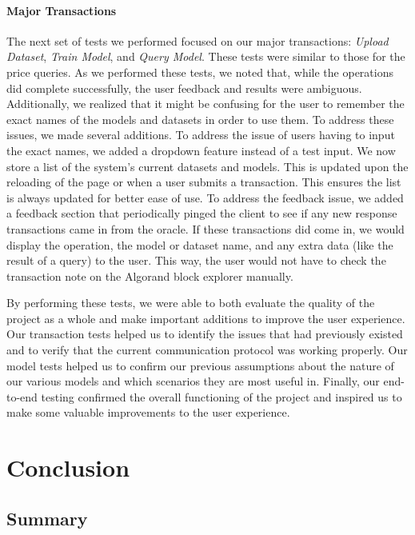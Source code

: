 \documentclass{ledger}
\begin{document}
\paragraph{Major Transactions}
The next set of tests we performed focused on our major transactions: \textit{Upload Dataset}, \textit{Train Model}, and
\textit{Query Model}.  These tests were similar to those for the price queries.  As we performed these tests, we noted
that, while the operations did complete successfully, the user feedback and results were ambiguous.  Additionally, we
realized that it might be confusing for the user to remember the exact names of the models and datasets in order to use
them.  To address these issues, we made several additions.  To address the issue of users having to input the exact names,
we added a dropdown feature instead of a test input.  We now store a list of the system's current datasets and models.
This is updated upon the reloading of the page or when a user submits a transaction.  This ensures the list is always
updated for better ease of use.  To address the feedback issue, we added a feedback section that periodically pinged the
client to see if any new response transactions came in from the oracle.  If these transactions did come in, we would
display the operation, the model or dataset name, and any extra data (like the result of a query) to the user.  This way,
the user would not have to check the transaction note on the Algorand block explorer manually.

By performing these tests, we were able to both evaluate the quality of the project as a whole and make important additions
to improve the user experience.  Our transaction tests helped us to identify the issues that had previously existed and
to verify that the current communication protocol was working properly.  Our model tests helped us to confirm our previous
assumptions about the nature of our various models and which scenarios they are most useful in.  Finally, our end-to-end
testing confirmed the overall functioning of the project and inspired us to make some valuable improvements to the user
experience.

\section{Conclusion}

\subsection{Summary}
\end{document}
